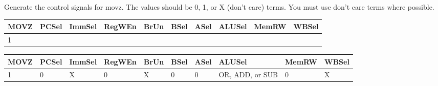 \begin{blocksection}

\question
Generate the control signals for movz. The values should be 0, 1, or X (don’t care) terms. You must use don’t care terms where possible.

\begin{tabular}{ |l|l|l|l|l|l|l|l|l|l| } 
 \hline
 MOVZ & PCSel & ImmSel & RegWEn & BrUn & BSel & ASel & ALUSel & MemRW & WBSel \\ [10pt]
 \hline
 1 & & & & & & & & & \\ [10pt]
 \hline
\end{tabular}

    
\begin{solution}[0.5in]
 \begin{tabular}{ |l|l|l|l|l|l|l|l|l|l| } 
 \hline
 MOVZ & PCSel & ImmSel & RegWEn & BrUn & BSel & ASel & ALUSel & MemRW & WBSel \\ [10pt]
 \hline
 1 & 0 & X & 0 & X & 0 & 0 & OR, ADD, or SUB & 0 & X \\ [10pt]
 \hline
\end{tabular}
\end{solution}

\end{blocksection}